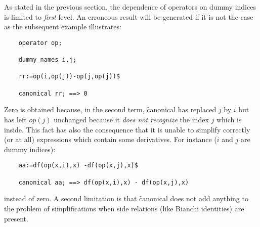 As stated in the previous section, the dependence of operators on dummy 
indices is limited to \emph{first} level. An erroneous result
will be generated if it is not the case as the subsequent example 
illustrates:
\begin{verbatim}
    operator op;

    dummy_names i,j;

    rr:=op(i,op(j))-op(j,op(j))$

    canonical rr; ==> 0
\end{verbatim}
Zero is obtained because, in the second term, \f{canonical} has replaced 
$j$ by $i$ but has left $op(j)$ unchanged because it \emph{does not recognize}
the index $j$ which is inside. This fact has also the consequence that 
it is unable to simplify correctly (or at all) expressions which 
contain some derivatives.
For instance ($i$ and $j$ are dummy indices):
\begin{verbatim}
    aa:=df(op(x,i),x) -df(op(x,j),x)$

    canonical aa; ==> df(op(x,i),x) - df(op(x,j),x)
\end{verbatim} 
instead of zero.
A second limitation is that \f{canonical} does not add anything to the
 problem of simplifications when side relations (like Bianchi identities) 
 are present.
